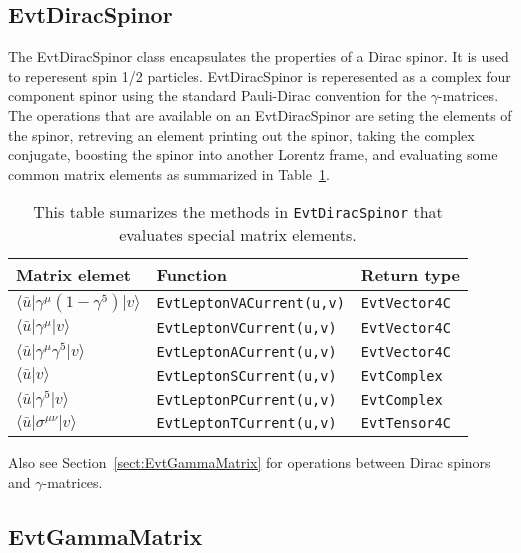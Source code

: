 \subsection{EvtDiracSpinor}

The EvtDiracSpinor class encapsulates the properties of
a Dirac spinor. It is used to reperesent spin 1/2 particles.
EvtDiracSpinor is reperesented as a complex four component 
spinor using the standard Pauli-Dirac convention for the
$\gamma$-matrices. The operations that are available on an EvtDiracSpinor 
are seting the elements of the spinor, retreving an element
printing out the spinor, taking the complex conjugate, boosting
the spinor into another Lorentz frame, and evaluating some
common matrix elements as summarized in Table~\ref{tab:diracspinor_matrix_elements}.
\begin{table}[htbp]
\begin{center}
\begin{tabular}{lll} \hline
Matrix elemet     &  Function & Return type\\ \hline
$\langle \bar u \vert \gamma^{\mu}(1-\gamma^5) \vert v \rangle$ & {\tt EvtLeptonVACurrent(u,v)} & {\tt EvtVector4C} \\
$\langle \bar u \vert \gamma^{\mu} \vert v \rangle$ & {\tt EvtLeptonVCurrent(u,v)} & {\tt EvtVector4C} \\
$\langle \bar u \vert \gamma^{\mu}\gamma^5 \vert v \rangle$ & {\tt EvtLeptonACurrent(u,v)} & {\tt EvtVector4C} \\
$\langle \bar u \vert v \rangle$ & {\tt EvtLeptonSCurrent(u,v)} & {\tt EvtComplex} \\
$\langle \bar u \vert \gamma^5 \vert v \rangle$ & {\tt EvtLeptonPCurrent(u,v)} & {\tt EvtComplex} \\
$\langle \bar u \vert \sigma^{\mu\nu} \vert v \rangle$ & {\tt EvtLeptonTCurrent(u,v)} & {\tt EvtTensor4C} \\ \hline
\end{tabular}
\caption{This table sumarizes the methods in {\tt EvtDiracSpinor} that evaluates special matrix elements.
\label{tab:diracspinor_matrix_elements}}
\end{center}
\end{table}

Also see Section~\ref{sect:EvtGammaMatrix} for operations between Dirac spinors and $\gamma$-matrices.






\subsection{EvtGammaMatrix}
\label{sect:EvtGammaMatrix}

